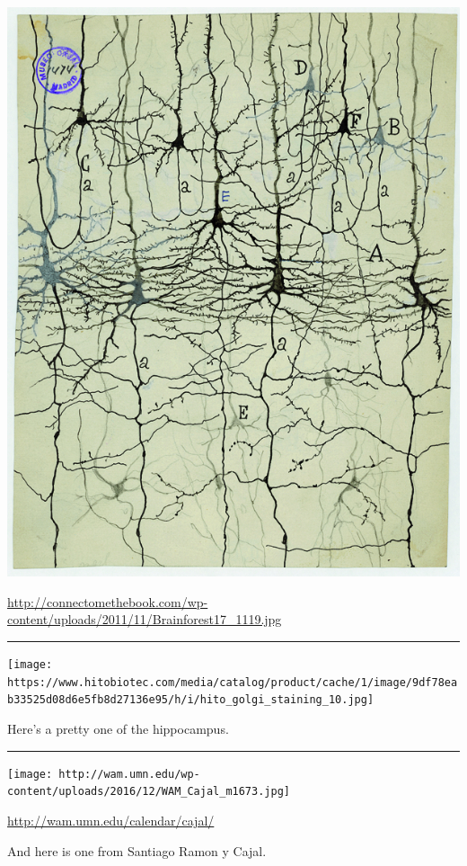 \documentclass[]{article}
\begin{document}
\includegraphics[width=8.5in]{img/golgi-stain}

\url{http://connectomethebook.com/wp-content/uploads/2011/11/Brainforest17_1119.jpg}

\begin{center}\rule{0.5\linewidth}{\linethickness}\end{center}

\texttt{[image: https://www.hitobiotec.com/media/catalog/product/cache/1/image/9df78eab33525d08d6e5fb8d27136e95/h/i/hito\_golgi\_staining\_10.jpg]}

Here's a pretty one of the hippocampus.

\begin{center}\rule{0.5\linewidth}{\linethickness}\end{center}

\texttt{[image: http://wam.umn.edu/wp-content/uploads/2016/12/WAM\_Cajal\_m1673.jpg]}

\url{http://wam.umn.edu/calendar/cajal/}

And here is one from Santiago Ramon y Cajal.
\end{document}
